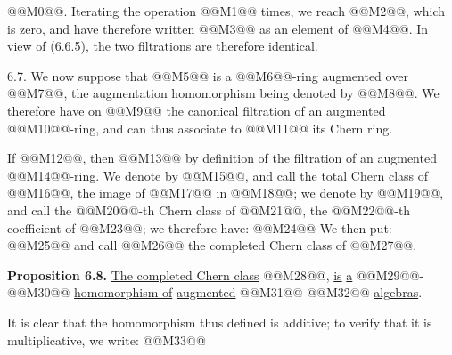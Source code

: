 @@M0@@. Iterating the operation @@M1@@ times, we reach @@M2@@, which is zero, and have therefore written @@M3@@ as an element of @@M4@@. In view of (6.6.5), the two filtrations are therefore identical.

6.7. We now suppose that @@M5@@ is a @@M6@@-ring augmented over @@M7@@, the augmentation homomorphism being denoted by @@M8@@. We therefore have on @@M9@@ the canonical filtration of an augmented @@M10@@-ring, and can thus associate to @@M11@@ its Chern ring.

If @@M12@@, then @@M13@@ by definition of the filtration of an augmented @@M14@@-ring. We denote by @@M15@@, and call the \uline{total Chern class of} @@M16@@, the image of @@M17@@ in @@M18@@; we denote by @@M19@@, and call the @@M20@@-th Chern class of @@M21@@, the @@M22@@-th coefficient of @@M23@@; we therefore have:
@@M24@@
We then put:
@@M25@@
and call @@M26@@ the completed Chern class of @@M27@@.

\textbf{Proposition 6.8.} \uline{The completed Chern class} @@M28@@, \uline{is} \uline{a} @@M29@@-@@M30@@-\uline{homomorphism of} \uline{augmented} @@M31@@-@@M32@@-\uline{algebras}.

It is clear that the homomorphism thus defined is additive; to verify that it is multiplicative, we write:
@@M33@@
